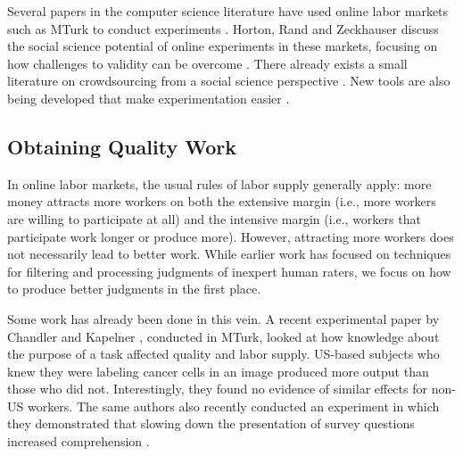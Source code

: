 \documentclass{cscw2010}
\begin{document}
Several papers in the computer science literature have used online
labor markets such as MTurk to conduct experiments
\cite{kittur2008crowdsourcing, snow2008cheap, sheng2008get}. Horton,
Rand and Zeckhauser discuss the social science potential of online
experiments in these markets, focusing on how challenges to validity
can be overcome \cite{hortonZeck2010}. There already exists a small
literature on crowdsourcing from a social science perspective
\cite{huberman-crowdsourcing, mason2009fip, horton2010labor,
  chen2009}. New tools are also being developed that make
experimentation easier \cite{little-turkit}.

\subsection{Obtaining Quality Work} 
In online labor markets, the usual rules of labor supply generally
apply: more money attracts more workers on both the
extensive margin (i.e., more workers are willing to participate at all) and the 
intensive margin (i.e., workers that participate work longer or produce more). However, attracting more workers does
not necessarily lead to better work. While earlier work \cite{von2004labeling, ipeirotis2010, snow2008cheap,
  Hopkins-King2010, downs2010your} has focused on techniques for filtering and
processing judgments of inexpert human raters, we focus
on how to produce better judgments in the first place.

Some work has already been done in this vein. A recent experimental
paper by Chandler and Kapelner \cite{chandler2010}, conducted in
MTurk, looked at how knowledge about the purpose of a task affected
quality and labor supply. US-based subjects who knew they were
labeling cancer cells in an image produced more output than those who did not.
  Interestingly, they found no evidence of similar
effects for non-US workers. The same authors also recently conducted
an experiment in which they demonstrated that slowing down the presentation of 
survey questions increased comprehension \cite{kapelnerpreventing}. 
\end{document}
